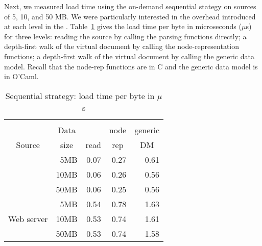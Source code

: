 

Next, we measured load time using the on-demand sequential stategy on
sources of 5, 10, and 50 MB.  We were particularly interested in the
overhead introduced at each level in the \condm{}.
Table~\ref{tab:linear} gives the load time per byte in microseconds
($\mu$s) for three levels: reading the source by calling the \pads{}
parsing functions directly; a depth-first walk of the virtual \Xml{}
document by calling the \padx{} node-representation functions; a
depth-first walk of the virtual \Xml{} document by calling the \padx{}
generic data model.  Recall that the node-rep functions are in C and
the generic data model is in O'Caml.
\begin{table}
\begin{center}
\begin{tabular}{c|r|r|r|r}
           &         &           &  \multicolumn{1}{c|}{\padx{}}   &  \multicolumn{1}{c}{\padx{}} \\
           & \multicolumn{1}{c|}{Data}  & \multicolumn{1}{c|}{\pads{}} & \multicolumn{1}{c|}{node}&  \multicolumn{1}{c}{generic} \\
Source     & \multicolumn{1}{c|}{size}  &  \multicolumn{1}{c|}{read}   & \multicolumn{1}{c|}{rep} &  \multicolumn{1}{c}{DM}  \\ \hline
           &  5MB  & 0.07    &  0.27  & 0.61 \\ %
\dibbler{} & 10MB  & 0.06    &  0.26  & 0.56 \\
           & 50MB  & 0.06    &  0.25  & 0.56 \\ \hline
           &  5MB  & 0.54    &  0.78  & 1.63 \\ %
Web server & 10MB  & 0.53    &  0.74  & 1.61 \\
           & 50MB  & 0.53    &  0.74  & 1.58 \\ 
\end{tabular}
\end{center}
\caption{Sequential strategy: load time per byte in $\mu$s}
\label{tab:linear}
\end{table}

